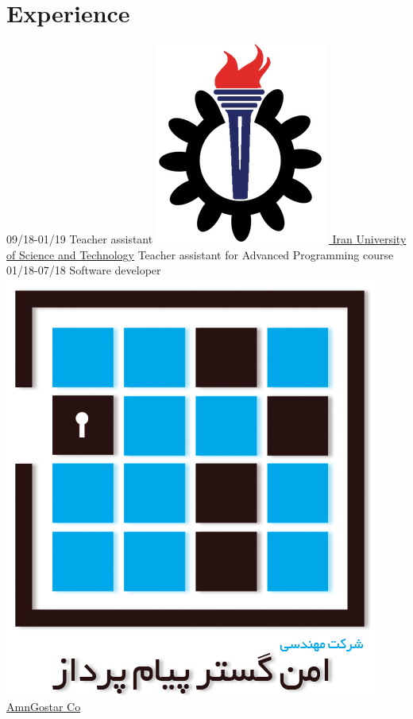 \documentclass[a4paper]{./classes/friggeri-cv}
\begin{document}
    \section{Experience}\label{sec:experience}
    \begin{entrylist}
        \entry
        {09/18-01/19}
        {    Teacher assistant}
        {\href{http://ce.iust.ac.ir/}{\includegraphics[scale=0.08]{../assets/images/logos/IUST_logo_color.png} Iran University of Science and Technology}}
        {Teacher assistant for Advanced Programming course}
        \entry
        {01/18-07/18}
        {    Software developer}
        {\href{http://www.amngostar-co.com/}{\includegraphics[scale=0.04]{../assets/images/logos/AmnGostar_logo.png} AmnGostar Co}}

\end{entrylist}
\end{document}
